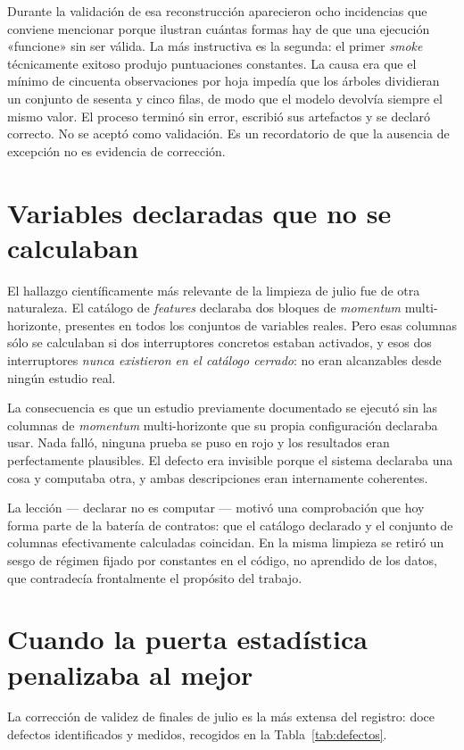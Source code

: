 Durante la validación de esa reconstrucción aparecieron ocho incidencias que conviene mencionar
porque ilustran cuántas formas hay de que una ejecución «funcione» sin ser válida. La más
instructiva es la segunda: el primer \textit{smoke} técnicamente exitoso produjo puntuaciones
constantes. La causa era que el mínimo de cincuenta observaciones por hoja impedía que los árboles
dividieran un conjunto de sesenta y cinco filas, de modo que el modelo devolvía siempre el mismo
valor. El proceso terminó sin error, escribió sus artefactos y se declaró correcto. No se aceptó
como validación. Es un recordatorio de que la ausencia de excepción no es evidencia de corrección.

\section{Variables declaradas que no se calculaban}

El hallazgo científicamente más relevante de la limpieza de julio fue de otra naturaleza. El
catálogo de \textit{features} declaraba dos bloques de \textit{momentum} multi-horizonte, presentes
en todos los conjuntos de variables reales. Pero esas columnas sólo se calculaban si dos
interruptores concretos estaban activados, y esos dos interruptores \emph{nunca existieron en el
catálogo cerrado}: no eran alcanzables desde ningún estudio real.

La consecuencia es que un estudio previamente documentado se ejecutó sin las columnas de
\textit{momentum} multi-horizonte que su propia configuración declaraba usar. Nada falló, ninguna
prueba se puso en rojo y los resultados eran perfectamente plausibles. El defecto era invisible
porque el sistema declaraba una cosa y computaba otra, y ambas descripciones eran internamente
coherentes.

La lección --- declarar no es computar --- motivó una comprobación que hoy forma parte de la
batería de contratos: que el catálogo declarado y el conjunto de columnas efectivamente calculadas
coincidan. En la misma limpieza se retiró un sesgo de régimen fijado por constantes en el código, no
aprendido de los datos, que contradecía frontalmente el propósito del trabajo.

\section{Cuando la puerta estadística penalizaba al mejor}

La corrección de validez de finales de julio es la más extensa del registro: doce defectos
identificados y medidos, recogidos en la Tabla~\ref{tab:defectos}.


